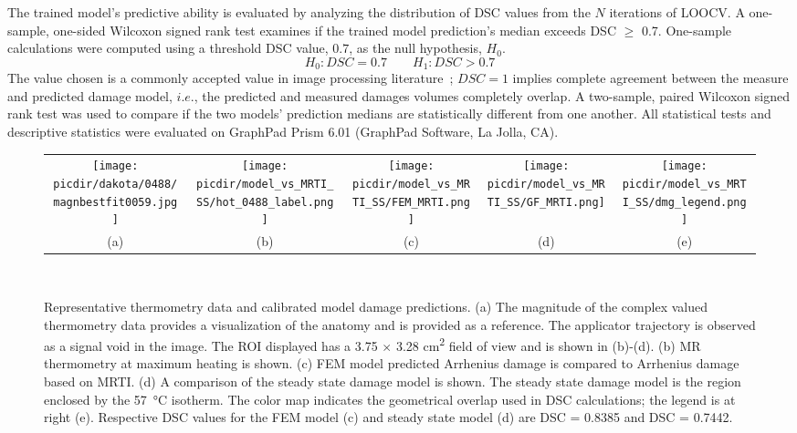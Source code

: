 \documentclass[12pt]{article}
\newcommand{\picdir}{pdffig}
\begin{document}
The trained model's predictive ability is
evaluated by analyzing the distribution of DSC values from the $N$ iterations of
LOOCV. 
A one-sample, one-sided Wilcoxon signed rank test examines if the trained
model prediction's median exceeds DSC $\geq$ 0.7. 
One-sample calculations were computed using a threshold DSC value, $0.7$, as 
the null hypothesis, $H_0$.
\[
   H_0: DSC  = 0.7  \qquad   H_1: DSC > 0.7
\]
{\color{red}
The value chosen is a commonly accepted value in image processing
literature~\cite{yung2010quantitative,Dice1945measures,zou2004three};  
$DSC=1$ implies complete agreement between the measure and predicted damage model,
$i.e.$, the predicted and measured damages volumes completely overlap.
}
A two-sample, paired Wilcoxon signed rank test was used to compare if the two models'
prediction medians are statistically different from one another.
All statistical tests and descriptive statistics were evaluated on
GraphPad Prism 6.01 (GraphPad Software, La Jolla, CA).

\begin{figure}[p!] 
\begin{tabular}{ccccc} 

\scalebox{0.16}{\texttt{[image: \\picdir/dakota/0488/magnbestfit0059.jpg]}} & \scalebox{0.257}{\texttt{[image: \\picdir/model\_vs\_MRTI\_SS/hot\_0488\_label.png]}}  & \scalebox{0.32}{\texttt{[image: \\picdir/model\_vs\_MRTI\_SS/FEM\_MRTI.png]}} & \scalebox{0.295}{\texttt{[image: \\picdir/model\_vs\_MRTI\_SS/GF\_MRTI.png]}} & \scalebox{0.28}{\texttt{[image: \\picdir/model\_vs\_MRTI\_SS/dmg\_legend.png]}}
\\
(a) & (b) & (c) & (d) & (e) \\
\end{tabular}
\\
\caption{Representative thermometry data and calibrated model damage predictions.
(a) The magnitude of the complex valued thermometry data provides a visualization
of the anatomy and is provided as a reference. The applicator trajectory
is observed as a signal void in the image. The ROI displayed has a 
3.75 $\times$ 3.28 \si{\cm\squared} field of view and is shown in (b)-(d).
(b) MR thermometry at maximum heating is shown.
(c) FEM model predicted Arrhenius damage is compared to
Arrhenius damage based on MRTI.
(d) A comparison of the steady state damage model is shown.
The steady state damage model 
is the region enclosed by the \SI{57}{\degreeCelsius} isotherm. 
The color map indicates the geometrical overlap used in DSC calculations;
the legend is at right (e).
Respective DSC values for the FEM model (c) and steady state
model (d) are DSC = 0.8385 and DSC = 0.7442.
}  
\label{RepresentativeData}
\end{figure}
\end{document}
